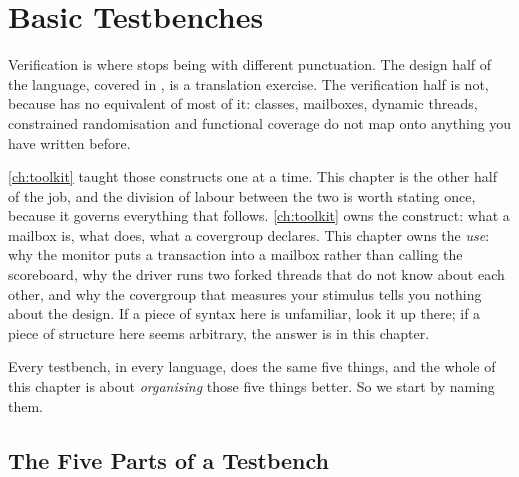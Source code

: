 \chapter{Basic Testbenches}
\label{ch:tb}


Verification is where \SV{} stops being \VHDL{} with different punctuation.
The design half of the language, covered in , is a
translation exercise. The
verification half is not, because \VHDL{} has no equivalent of most of it:
classes, mailboxes, dynamic threads, constrained randomisation and functional
coverage do not map onto anything you have written before.

\cref{ch:toolkit} taught those constructs one at a time. This chapter is the
other half of the job, and the division of labour between the two is worth
stating once, because it governs everything that follows. \cref{ch:toolkit}
owns the construct: what a mailbox is, what  does,
what a covergroup declares. This chapter owns the \emph{use}: why the monitor
puts a transaction into a mailbox rather than calling the scoreboard, why the
driver runs two forked threads that do not know about each other, and why the
covergroup that measures your stimulus tells you nothing about the design. If
a piece of syntax here is unfamiliar, look it up there; if a piece of
structure here seems arbitrary, the answer is in this chapter.

Every testbench, in every language, does the same five things, and the whole
of this chapter is about \emph{organising} those five things better. So we
start by naming them.

\section{The Five Parts of a Testbench}
\label{sec:tb:five}

